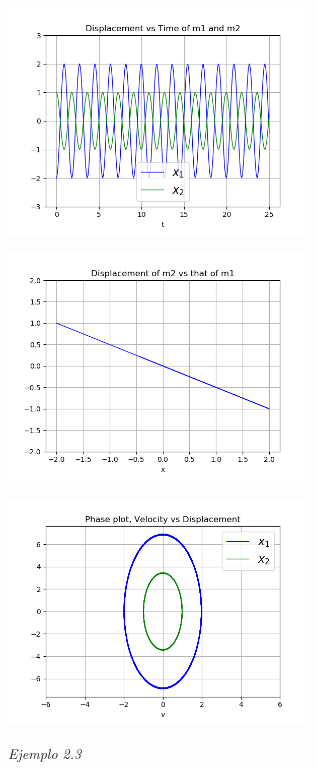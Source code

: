 \documentclass[a4paper]{article}
\begin{document}
\begin{center}
\includegraphics[height=6cm]{ejemplo2-2.png}

\includegraphics[height=6cm]{recta2-2.png}

\includegraphics[height=6cm]{circulo2-2.png}
\end{center}

\textit{Ejemplo 2.3}
\end{document}

